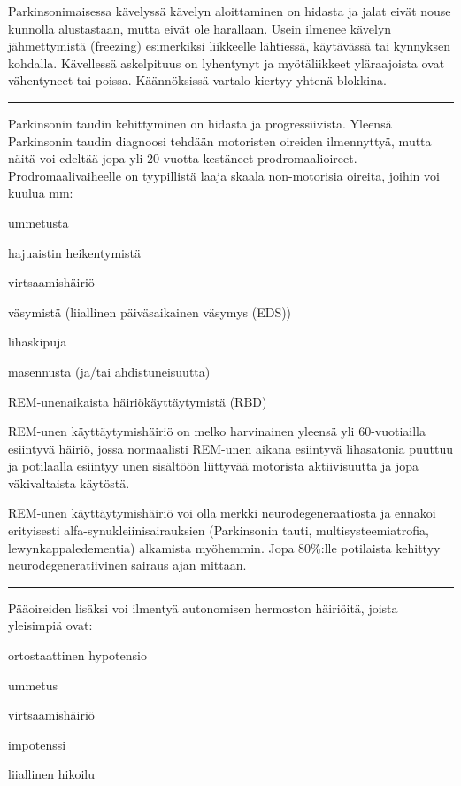 \documentclass[
]{book}
\begin{document}
Parkinsonimaisessa kävelyssä kävelyn aloittaminen on hidasta ja jalat eivät nouse kunnolla alustastaan, mutta eivät ole harallaan. Usein ilmenee kävelyn jähmettymistä (freezing) esimerkiksi liikkeelle lähtiessä, käytävässä tai kynnyksen kohdalla. Kävellessä askelpituus on lyhentynyt ja myötäliikkeet yläraajoista ovat vähentyneet tai poissa. Käännöksissä vartalo kiertyy yhtenä blokkina.

\begin{center}\rule{0.5\linewidth}{0.5pt}\end{center}

Parkinsonin taudin kehittyminen on hidasta ja progressiivista. Yleensä Parkinsonin taudin diagnoosi tehdään motoristen oireiden ilmennyttyä, mutta näitä voi edeltää jopa yli 20 vuotta kestäneet prodromaalioireet. Prodromaalivaiheelle on tyypillistä laaja skaala non-motorisia oireita, joihin voi kuulua mm:

ummetusta

hajuaistin heikentymistä

virtsaamishäiriö

väsymistä (liiallinen päiväsaikainen väsymys (EDS))

lihaskipuja

masennusta (ja/tai ahdistuneisuutta)

REM-unenaikaista häiriökäyttäytymistä (RBD)

REM-unen käyttäytymishäiriö on melko harvinainen yleensä yli 60-vuotiailla esiintyvä häiriö, jossa normaalisti REM-unen aikana esiintyvä lihasatonia puuttuu ja potilaalla esiintyy unen sisältöön liittyvää motorista aktiivisuutta ja jopa väkivaltaista käytöstä.

REM-unen käyttäytymishäiriö voi olla merkki neurodegeneraatiosta ja ennakoi erityisesti alfa-synukleiinisairauksien (Parkinsonin tauti, multisysteemiatrofia, lewynkappaledementia) alkamista myöhemmin. Jopa 80\%:lle potilaista kehittyy neurodegeneratiivinen sairaus ajan mittaan.

\begin{center}\rule{0.5\linewidth}{0.5pt}\end{center}

Pääoireiden lisäksi voi ilmentyä autonomisen hermoston häiriöitä, joista yleisimpiä ovat:

ortostaattinen hypotensio

ummetus

virtsaamishäiriö

impotenssi

liiallinen hikoilu
\end{document}
